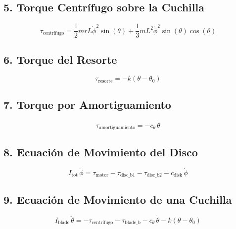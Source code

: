 \documentclass{article}
\begin{document}
\subsection*{5. Torque Centrífugo sobre la Cuchilla}

\[
\tau_{\text{centrífugo}} = \frac{1}{2} m r L \dot{\phi}^2 \sin(\theta) + \frac{1}{3} m L^2 \dot{\phi}^2 \sin(\theta) \cos(\theta)
\]

\subsection*{6. Torque del Resorte}

\[
\tau_{\text{resorte}} = -k (\theta - \theta_0)
\]

\subsection*{7. Torque por Amortiguamiento}

\[
\tau_{\text{amortiguamiento}} = -c_{\theta} \, \dot{\theta}
\]

\subsection*{8. Ecuación de Movimiento del Disco}

\[
I_{\text{tot}} \, \ddot{\phi} = \tau_{\text{motor}} - \tau_{\text{disc\_b1}} - \tau_{\text{disc\_b2}} - c_{\text{disk}} \, \dot{\phi}
\]

\subsection*{9. Ecuación de Movimiento de una Cuchilla}

\[
I_{\text{blade}} \, \ddot{\theta} = -\tau_{\text{centrífugo}} - \tau_{\text{blade\_b}} - c_{\theta} \, \dot{\theta} - k(\theta - \theta_0)
\]
\end{document}

